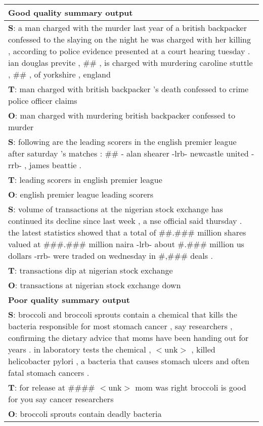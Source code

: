 \documentclass[11pt]{article}
\begin{document}
\begin{table}
\begin{center}
{\small
\begin{tabular}{|p{7.5cm}|}
\hline
{\bf Good quality summary output} \\
\hline
{\bf S}: a man charged with the murder last year of a british backpacker confessed to the slaying on the night he was charged with her killing , according to police evidence presented at a court hearing tuesday .  ian douglas previte , \#\# , is charged with murdering caroline stuttle , \#\# , of yorkshire , england\\ 
{\bf T}: man charged with british backpacker 's death confessed to crime police officer claims \\
{\bf O}: man charged with murdering british backpacker confessed to murder \\
 \hline
{\bf S}: following are the leading scorers in the english premier league after saturday 's matches : \#\# - alan shearer -lrb- newcastle united -rrb- , james beattie .\\
{\bf T}: leading scorers in english premier league \\
{\bf O}: english premier league leading scorers \\
\hline
{\bf S}: volume of transactions at the nigerian stock exchange has continued its decline since last week , a nse official said thursday .  the latest statistics showed that a total of \#\#.\#\#\# million shares valued at \#\#\#.\#\#\# million naira -lrb- about \#.\#\#\# million us dollars -rrb- were traded on wednesday in \#,\#\#\# deals .\\
{\bf T}: transactions dip at nigerian stock exchange \\
{\bf O}: transactions at nigerian stock exchange down \\
\hline
{\bf Poor quality summary output} \\
\hline
{\bf S}: broccoli and broccoli sprouts contain a chemical that kills the bacteria responsible for most stomach cancer , say researchers , confirming the dietary advice that moms have been handing out for years . in laboratory tests the chemical , $<$unk$>$ , killed helicobacter pylori , a bacteria that causes stomach ulcers and often fatal stomach cancers . \\
{\bf T}:  for release at \#\#\#\# $<$unk$>$ mom was right broccoli is good for you say cancer researchers \\
{\bf O}: broccoli sprouts contain deadly bacteria \\

\end{tabular}}
\end{center}
\end{table}
\end{document}
